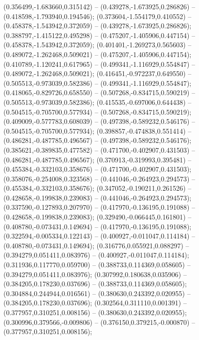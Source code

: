  (0.356499,-1.683660,0.315142) -- (0.439278,-1.673925,0.286826) -- (0.418598,-1.793940,0.194546);
 (0.373604,-1.554179,0.410552) -- (0.458378,-1.543942,0.372059) -- (0.439278,-1.673925,0.286826);
 (0.388797,-1.415122,0.495298) -- (0.475207,-1.405906,0.447154) -- (0.458378,-1.543942,0.372059);
 (0.401401,-1.269273,0.565603) -- (0.489072,-1.262468,0.509021) -- (0.475207,-1.405906,0.447154);
 (0.410789,-1.120241,0.617965) -- (0.499341,-1.116929,0.554847) -- (0.489072,-1.262468,0.509021);
 (0.416451,-0.972237,0.649550) -- (0.505513,-0.973039,0.582386) -- (0.499341,-1.116929,0.554847);
 (0.418065,-0.829726,0.658550) -- (0.507268,-0.834715,0.590219) -- (0.505513,-0.973039,0.582386);
 (0.415535,-0.697006,0.644438) -- (0.504515,-0.705700,0.577934) -- (0.507268,-0.834715,0.590219);
 (0.409009,-0.577783,0.608039) -- (0.497398,-0.589232,0.546176) -- (0.504515,-0.705700,0.577934);
 (0.398857,-0.474838,0.551414) -- (0.486281,-0.487785,0.496567) -- (0.497398,-0.589232,0.546176);
 (0.385621,-0.389835,0.477582) -- (0.471700,-0.402907,0.431503) -- (0.486281,-0.487785,0.496567);
 (0.370913,-0.319993,0.395481) -- (0.455384,-0.332103,0.358676) -- (0.471700,-0.402907,0.431503);
 (0.358076,-0.254008,0.323568) -- (0.441046,-0.264923,0.294573) -- (0.455384,-0.332103,0.358676);
 (0.347052,-0.190211,0.261526) -- (0.428658,-0.199838,0.239083) -- (0.441046,-0.264923,0.294573);
 (0.337590,-0.127893,0.207970) -- (0.417970,-0.136195,0.191088) -- (0.428658,-0.199838,0.239083);
 (0.329490,-0.066445,0.161801) -- (0.408780,-0.073431,0.149694) -- (0.417970,-0.136195,0.191088);
 (0.322594,-0.005334,0.122143) -- (0.400927,-0.011047,0.114184) -- (0.408780,-0.073431,0.149694);
 (0.316776,0.055921,0.088297) -- (0.394279,0.051411,0.083976) -- (0.400927,-0.011047,0.114184);
 (0.311936,0.117770,0.059700) -- (0.388733,0.114369,0.058605) -- (0.394279,0.051411,0.083976);
 (0.307992,0.180638,0.035906) -- (0.384205,0.178230,0.037696) -- (0.388733,0.114369,0.058605);
 (0.304884,0.244944,0.016561) -- (0.380630,0.243392,0.020955) -- (0.384205,0.178230,0.037696);
 (0.302564,0.311110,0.001391) -- (0.377957,0.310251,0.008156) -- (0.380630,0.243392,0.020955);
 (0.300996,0.379566,-0.009806) -- (0.376150,0.379215,-0.000870) -- (0.377957,0.310251,0.008156);
